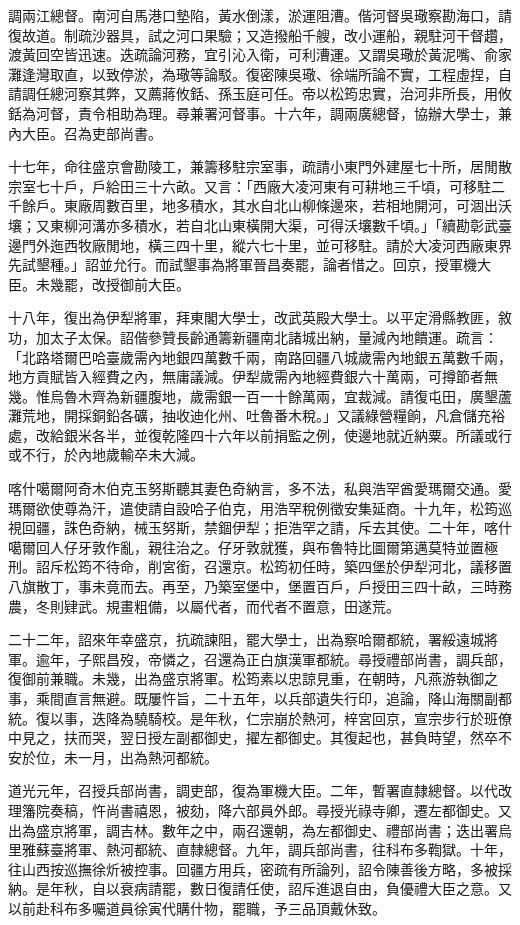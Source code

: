 \begin{pinyinscope}
調兩江總督。南河自馬港口墊陷，黃水倒漾，淤運阻漕。偕河督吳璥察勘海口，請復故道。制疏沙器具，試之河口果驗；又造撥船千艘，改小運船，親駐河干督趲，渡黃回空皆迅速。迭疏論河務，宜引沁入衛，可利漕運。又謂吳璥於黃泥嘴、俞家灘逢灣取直，以致停淤，為璥等論駁。復密陳吳璥、徐端所論不實，工程虛捏，自請調任總河察其弊，又薦蔣攸銛、孫玉庭可任。帝以松筠忠實，治河非所長，用攸銛為河督，責令相助為理。尋兼署河督事。十六年，調兩廣總督，協辦大學士，兼內大臣。召為吏部尚書。

十七年，命往盛京會勘陵工，兼籌移駐宗室事，疏請小東門外建屋七十所，居閒散宗室七十戶，戶給田三十六畝。又言：「西廠大凌河東有可耕地三千頃，可移駐二千餘戶。東廠周數百里，地多積水，其水自北山柳條邊來，若相地開河，可涸出沃壤；又東柳河溝亦多積水，若自北山東橫開大渠，可得沃壤數千頃。」「續勘彰武臺邊門外迤西牧廠閒地，橫三四十里，縱六七十里，並可移駐。請於大凌河西廠東界先試墾種。」詔並允行。而試墾事為將軍晉昌奏罷，論者惜之。回京，授軍機大臣。未幾罷，改授御前大臣。

十八年，復出為伊犁將軍，拜東閣大學士，改武英殿大學士。以平定滑縣教匪，敘功，加太子太保。詔偕參贊長齡通籌新疆南北諸城出納，量減內地饋運。疏言：「北路塔爾巴哈臺歲需內地銀四萬數千兩，南路回疆八城歲需內地銀五萬數千兩，地方貢賦皆入經費之內，無庸議減。伊犁歲需內地經費銀六十萬兩，可撙節者無幾。惟烏魯木齊為新疆腹地，歲需銀一百一十餘萬兩，宜裁減。請復屯田，廣墾蘆灘荒地，開採銅鉛各礦，抽收迪化州、吐魯番木稅。」又議綠營糧餉，凡倉儲充裕處，改給銀米各半，並復乾隆四十六年以前捐監之例，使邊地就近納粟。所議或行或不行，於內地歲輸卒未大減。

喀什噶爾阿奇木伯克玉努斯聽其妻色奇納言，多不法，私與浩罕酋愛瑪爾交通。愛瑪爾欲使尊為汗，遣使請自設哈子伯克，用浩罕稅例徵安集延商。十九年，松筠巡視回疆，誅色奇納，械玉努斯，禁錮伊犁；拒浩罕之請，斥去其使。二十年，喀什噶爾回人仔牙敦作亂，親往治之。仔牙敦就獲，與布魯特比圖爾第邁莫特並置極刑。詔斥松筠不待命，削宮銜，召還京。松筠初任時，築四堡於伊犁河北，議移置八旗散丁，事未竟而去。再至，乃築室堡中，堡置百戶，戶授田三四十畝，三時務農，冬則肄武。規畫粗備，以屬代者，而代者不置意，田遂荒。

二十二年，詔來年幸盛京，抗疏諫阻，罷大學士，出為察哈爾都統，署綏遠城將軍。逾年，子熙昌歿，帝憐之，召還為正白旗漢軍都統。尋授禮部尚書，調兵部，復御前兼職。未幾，出為盛京將軍。松筠素以忠諒見重，在朝時，凡燕游執御之事，乘間直言無避。既屢忤旨，二十五年，以兵部遺失行印，追論，降山海關副都統。復以事，迭降為驍騎校。是年秋，仁宗崩於熱河，梓宮回京，宣宗步行於班僚中見之，扶而哭，翌日授左副都御史，擢左都御史。其復起也，甚負時望，然卒不安於位，未一月，出為熱河都統。

道光元年，召授兵部尚書，調吏部，復為軍機大臣。二年，暫署直隸總督。以代改理籓院奏稿，忤尚書禧恩，被劾，降六部員外郎。尋授光祿寺卿，遷左都御史。又出為盛京將軍，調吉林。數年之中，兩召還朝，為左都御史、禮部尚書；迭出署烏里雅蘇臺將軍、熱河都統、直隸總督。九年，調兵部尚書，往科布多鞫獄。十年，往山西按巡撫徐炘被控事。回疆方用兵，密疏有所論列，詔令陳善後方略，多被採納。是年秋，自以衰病請罷，數日復請任使，詔斥進退自由，負優禮大臣之意。又以前赴科布多囑道員徐寅代購什物，罷職，予三品頂戴休致。


\end{pinyinscope}
